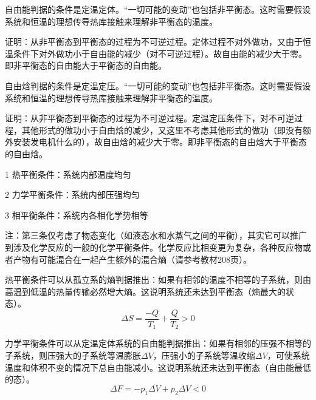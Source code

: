 \documentclass[CJK]{beamer}
\begin{document}
\begin{frame}
\bch
自由能判据的条件是定温定体。“一切可能的变动”也包括非平衡态。这时需要假设系统和恒温的理想传导热库接触来理解非平衡态的温度。


证明：从非平衡态到平衡态的过程为不可逆过程。定体过程不对外做功，又由于恒温条件下对外做功小于自由能的减少（对不可逆过程）。故自由能的减少大于零。即非平衡态的自由能大于平衡态的自由能。

\ech
\end{frame}

\begin{frame}
\bch
自由焓判据的条件是定温定压。“一切可能的变动”也包括非平衡态。这时需要假设系统和恒温的理想传导热库接触来理解非平衡态的温度。


证明：从非平衡态到平衡态的过程为不可逆过程。定温定压条件下，对不可逆过程，其他形式的做功小于自由焓的减少，又这里不考虑其他形式的做功（即没有额外安装发电机什么的），故自由焓的减少大于零。即非平衡态的自由焓大于平衡态的自由焓。

\ech
\end{frame}

\begin{frame}
\bch
\bitem
\item[1]{\blue 热平衡条件：系统内部温度均匀}
\item[2]{\blue 力学平衡条件：系统内部压强均匀}
\item[3]{\blue 相平衡条件：系统内各相化学势相等}
\eitem

{\scriptsize
注：第三条仅考虑了物态变化（如液态水和水蒸气之间的平衡），其实它可以推广到涉及化学反应的一般的化学平衡条件。化学反应比相变更为复杂，各种反应物或者产物有可能混合在一起产生额外的混合熵（请参考教材208页）。
}
\ech
\end{frame}


\begin{frame}
\bch
热平衡条件可以从孤立系的熵判据推出：如果有相邻的温度不相等的子系统，则由高温到低温的热量传输必然增大熵。这说明系统还未达到平衡态（熵最大的状态）。
$$\Delta S = \frac{-Q}{T_1} + \frac{Q}{T_2} > 0$$
\ech
\end{frame}

\begin{frame}
\bch
力学平衡条件可以从定温定体系统的自由能判据推出：如果有相邻的压强不相等的子系统，则压强大的子系统等温膨胀$\Delta V$，压强小的子系统等温收缩$\Delta V$，可使系统温度和体积不变的情况下总自由能减小。这说明系统还未达到平衡态（自由能最低的态）。
$$\Delta F = -p_1 \Delta V + p_2 \Delta V < 0 $$
\ech
\end{frame}
\end{document}
